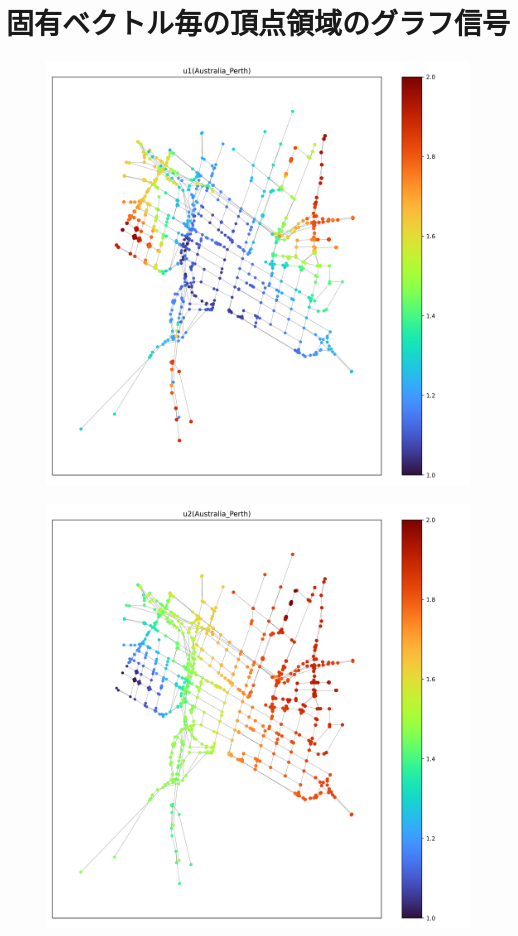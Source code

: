 \documentclass[dvipdfmx]{jsarticle}
\begin{document}
\newpage
\section{固有ベクトル毎の頂点領域のグラフ信号}

\begin{figure}[h]
  \centering
  \includegraphics[width=\linewidth]{fig/u1_Australia_Perth.png}
\end{figure}
\begin{figure}[h]
  \centering
  \includegraphics[width=\linewidth]{fig/u2_Australia_Perth.png}
\end{figure}
\end{document}
